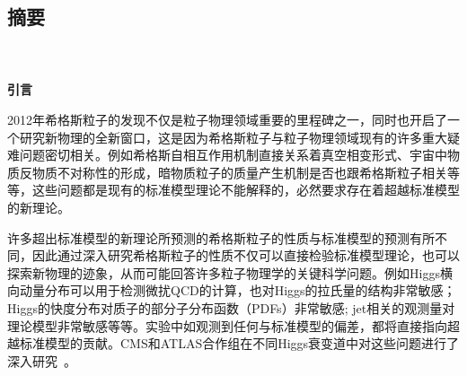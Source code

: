\begin{CJK}{UTF8}{gbsn}
\chapter{摘要}
\\ \\
\textbf{\large{引言}} %
\par 	2012年希格斯粒子的发现不仅是粒子物理领域重要的里程碑之一，同时也开启了一个研究新物理的全新窗口，这是因为希格斯粒子与粒子物理领域现有的许多重大疑难问题密切相关。例如希格斯自相互作用机制直接关系着真空相变形式、宇宙中物质反物质不对称性的形成，暗物质粒子的质量产生机制是否也跟希格斯粒子相关等等，这些问题都是现有的标准模型理论不能解释的，必然要求存在着超越标准模型的新理论。
\par 许多超出标准模型的新理论所预测的希格斯粒子的性质与标准模型的预测有所不同，因此通过深入研究希格斯粒子的性质不仅可以直接检验标准模型理论，也可以探索新物理的迹象，从而可能回答许多粒子物理学的关键科学问题。例如Higgs横向动量分布可以用于检测微扰QCD的计算，也对Higgs的拉氏量的结构非常敏感；Higgs的快度分布对质子的部分子分布函数（PDFs）非常敏感; jet相关的观测量对理论模型非常敏感等等。实验中如观测到任何与标准模型的偏差，都将直接指向超越标准模型的贡献。CMS和ATLAS合作组在不同Higgs衰变道中对这些问题进行了深入研究~\cite{Khachatryan:2015yvw, CMS:2015hja, CMS:2016rqf, Sirunyan:2017exp, CMS:2018hhg, ATLAS-CONF-2019-029, atlas-conf-2019-025, ATLAS:2018uso, ATLAS-CONF-2019-032, ATLAS:2017myr,  CMS:Hgg_8TeV, CMS:2019chr, Sirunyan:2020xwk}。

\end{CJK}

